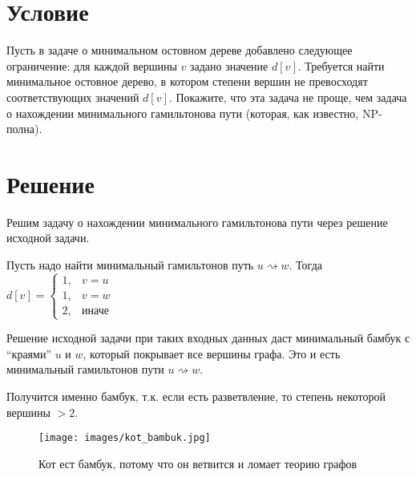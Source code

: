 

\cfoot{}



\section{Условие}

Пусть в задаче о минимальном остовном дереве добавлено следующее ограничение: для каждой
вершины $v$ задано значение $d[v]$. Требуется найти минимальное остовное дерево, в котором
степени вершин не превосходят соответствующих значений $d[v]$. Покажите, что эта задача не
проще, чем задача о нахождении минимального гамильтонова пути (которая, как известно,
NP-полна).

\section{Решение}

Решим задачу о нахождении минимального гамильтонова пути через решение исходной
задачи.

Пусть надо найти минимальный гамильтонов путь $u\rightsquigarrow w$. Тогда $d[v]
    = \begin{cases}
        1 , & v = u        \\
        1 , & v = w        \\
        2 , & \text{иначе}
    \end{cases}$

Решение исходной задачи при таких входных данных даст минимальный бамбук с
``краями'' $u$ и $w$, который покрывает все вершины графа. Это и есть
минимальный гамильтонов пути $u\rightsquigarrow w$.

\begin{remark}
    Получится именно бамбук, т.к. если есть разветвление, то степень некоторой
    вершины $> 2$.
\end{remark}

\begin{figure}[h]
    \texttt{[image: images/kot\_bambuk.jpg]}
    \centering
    \caption{Кот ест бамбук, потому что он ветвится и ломает теорию графов}
\end{figure}

